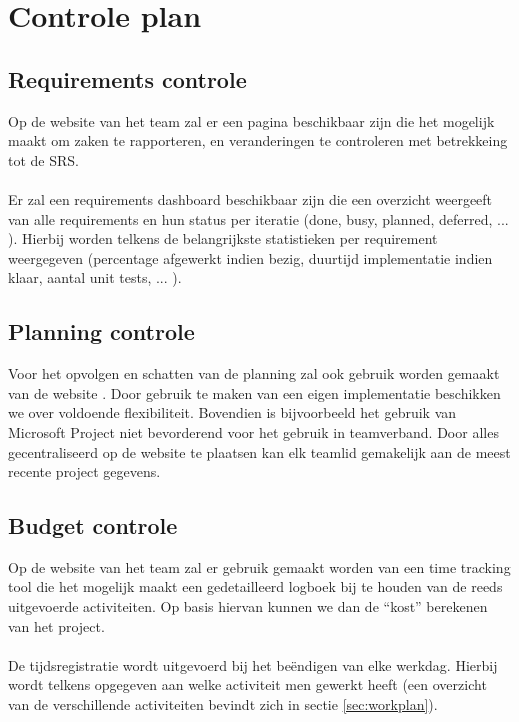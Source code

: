 \section{Controle plan}
\subsection{Requirements controle} \label{RequirementsControlPlan}
Op de website van het team \cite{portalWebsite} zal er een pagina beschikbaar zijn die het mogelijk maakt om zaken te rapporteren, en veranderingen te controleren met betrekkeing tot de SRS.
\\
\\
Er zal een requirements dashboard beschikbaar zijn die een overzicht weergeeft van alle requirements en hun status per iteratie (done, busy, planned, deferred, ... ). Hierbij worden telkens de belangrijkste statistieken per requirement weergegeven (percentage afgewerkt indien bezig, duurtijd implementatie indien klaar, aantal unit tests, ... ).

\subsection{Planning controle}
Voor het opvolgen en schatten van de planning zal ook gebruik worden gemaakt van de website \cite{portalWebsite}. Door gebruik te maken van een eigen implementatie beschikken we over voldoende flexibiliteit. Bovendien is bijvoorbeeld het gebruik van Microsoft Project \cite{MicrosoftProject} niet bevorderend voor het gebruik in teamverband. Door alles gecentraliseerd op de website te plaatsen kan elk teamlid gemakelijk aan de meest recente project gegevens.

\subsection{Budget controle}
Op de website van het team \cite{portalWebsite} zal er gebruik gemaakt worden van een time tracking tool die het mogelijk maakt een gedetailleerd logboek bij te houden van de reeds uitgevoerde activiteiten. Op basis hiervan kunnen we dan de ``kost'' berekenen van het project. 
\\
\\
De tijdsregistratie wordt uitgevoerd bij het be\"{e}ndigen van elke werkdag. Hierbij wordt telkens opgegeven aan welke activiteit men gewerkt heeft (een overzicht van de verschillende activiteiten bevindt zich in sectie \ref{sec:workplan}).

